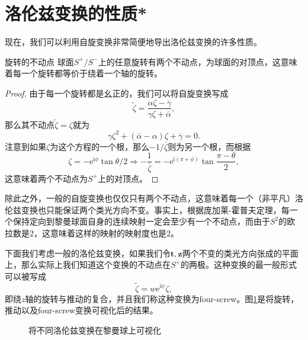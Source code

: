 \section{洛伦兹变换的性质*}

现在，我们可以利用自旋变换非常简便地导出洛伦兹变换的许多性质。

\begin{prop}[label={prop:fixed point of rotation}]{旋转的不动点}
	球面$S^{+} /S^{-}$上的任意旋转有两个不动点，为球面的对顶点，这意味着每一个旋转都等价于绕着一个轴的旋转。
\end{prop}


\begin{proof}
	由于每一个旋转都是幺正的，我们可以将自旋变换写成
	\begin{equation*}
		\tilde{\zeta } =\frac{\alpha \zeta -\overline{\gamma }}{\gamma \zeta +\overline{\alpha }} ,
	\end{equation*}
	那么其不动点$\tilde{\zeta } =\zeta $就为
	\begin{equation*}
		\gamma \zeta ^{2} +(\overline{\alpha } -\alpha )\zeta +\overline{\gamma } =0.
	\end{equation*}
	注意到如果$\zeta $为这个方程的一个根，那么$-1/\overline{\zeta }$则为另一个根，而根据
	\begin{equation*}
		\zeta =-\mathrm{e}^{\mathrm{i} \phi }\tan \theta /2\Rightarrow -\frac{1}{\overline{\zeta }} =-\mathrm{e}^{\mathrm{i} (\pi +\phi )}\tan\frac{\pi -\theta }{2} ,
	\end{equation*}
	这意味着两个不动点为$S^{+}$上的对顶点。
\end{proof}

除此之外，一般的自旋变换也仅仅只有两个不动点，这意味着每一个（非平凡）洛伦兹变换也只能保证两个类光方向不变。事实上，根据庞加莱-霍普夫定理，每一个保持定向到黎曼球面自身的连续映射一定会至少有一个不动点，而由于$S^{2}$的欧拉数是$2$，这意味着这样的映射的映射度也是$2$。



下面我们考虑一般的洛伦兹变换，如果我们令$\boldsymbol{t} ,\boldsymbol{z}$两个不变的类光方向张成的平面上，那么实际上我们知道这个变换的不动点在$S^{+}$的两极。这种变换的最一般形式可以被写成
\begin{equation*}
	\tilde{\zeta } =w\mathrm{e}^{\mathrm{i} \psi } \zeta ,
\end{equation*}
即绕$z$轴的旋转与推动的复合，并且我们称这种变换为four-screw。图\ref{fig:visualization of lorentz transformation}是将旋转，推动以及four-screw变换可视化后的结果。

\begin{figure}[h]
	\centering
	
	\caption{将不同洛伦兹变换在黎曼球上可视化}
	\label{fig:visualization of lorentz transformation}
\end{figure}


